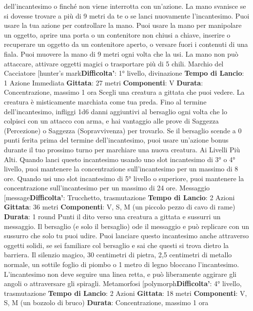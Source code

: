 \begin{multicols}{2}
dell’incantesimo o finché non viene interrotta con
un’azione. La mano svanisce se si dovesse trovare a
più di 9 metri da te o se lanci nuovamente
l’incantesimo.
Puoi usare la tua azione per controllare la mano. Puoi
usare la mano per manipolare un oggetto, aprire una
porta o un contenitore non chiusi a chiave, inserire o
recuperare un oggetto da un contenitore aperto, o
versare fuori i contenuti di una fiala. Puoi muovere la
mano di 9 metri ogni volta che la usi.
La mano non può attaccare, attivare oggetti magici o
trasportare più di 5 chili.
Marchio del Cacciatore
[hunter’s mark\textbf{Difficolta'}:
1° livello, divinazione
\textbf{Tempo di Lancio}: 1 Azione Immediata
\textbf{Gittata}: 27 metri
\textbf{Componenti}: V
\textbf{Durata}: Concentrazione, massimo 1 ora
Scegli una creatura a gittata che puoi vedere. La
creatura è misticamente marchiata come tua preda.
Fino al termine dell’incantesimo, infliggi 1d6 danni
aggiuntivi al bersaglio ogni volta che lo colpisci con un
attacco con arma, e hai vantaggio alle prove di
Saggezza (Percezione) o Saggezza (Sopravvivenza)
per trovarlo. Se il bersaglio scende a 0 punti ferita prima
del termine dell’incantesimo, puoi usare un’azione
bonus durante il tuo prossimo turno per marchiare una
nuova creatura.
Ai Livelli Più Alti. Quando lanci questo incantesimo
usando uno slot incantesimo di 3° o 4° livello, puoi
mantenere la concentrazione sull’incantesimo per un
massimo di 8 ore. Quando usi uno slot incantesimo di
5° livello o superiore, puoi mantenere la concentrazione
sull’incantesimo per un massimo di 24 ore.
Messaggio
[message\textbf{Difficolta'}:
Trucchetto, trasmutazione
\textbf{Tempo di Lancio}: 2 Azioni
\textbf{Gittata}: 36 metri
\textbf{Componenti}: V, S, M (un piccolo pezzo di cavo di
rame)
\textbf{Durata}: 1 round
Punti il dito verso una creatura a gittata e sussurri un
messaggio. Il bersaglio (e solo il bersaglio) ode il
messaggio e può replicare con un sussurro che solo tu
puoi udire.
Puoi lanciare questo incantesimo anche attraverso
oggetti solidi, se sei familiare col bersaglio e sai che
questi si trova dietro la barriera. Il silenzio magico, 30
centimetri di pietra, 2,5 centimetri di metallo normale,
un sottile foglio di piombo o 1 metro di legno bloccano
l’incantesimo. L’incantesimo non deve seguire una linea
retta, e può liberamente aggirare gli angoli o
attraversare gli spiragli.
Metamorfosi
[polymorph\textbf{Difficolta'}:
4° livello, trasmutazione
\textbf{Tempo di Lancio}: 2 Azioni
\textbf{Gittata}: 18 metri
\textbf{Componenti}: V, S, M (un bozzolo di bruco)
\textbf{Durata}: Concentrazione, massimo 1 ora

\end{multicols}
